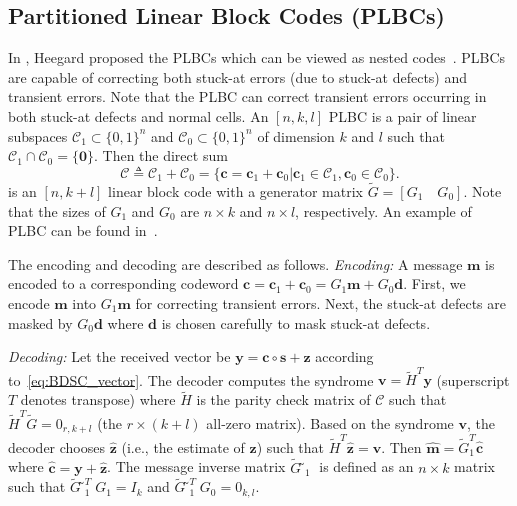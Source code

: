 \documentclass[10pt,twocolumn,twoside,submit]{JCNtran}
\begin{document}
\subsection{Partitioned Linear Block Codes (PLBCs)} \label{subsec:PLBC}

	In \cite{Heegard1983plbc}, Heegard proposed the PLBCs which can be viewed as nested codes~\cite{Zamir2002nested}. PLBCs are capable of correcting both stuck-at errors (due to stuck-at defects) and transient errors. Note that the PLBC can correct transient errors occurring in both stuck-at defects and normal cells. An $[n,k,l]$ PLBC is a pair of linear subspaces ${\mathcal{C}}_1 \subset \{0, 1\}^n$ and ${\mathcal{C}}_0 \subset \{0, 1\}^n$ of dimension $k$ and $l$ such that ${\mathcal{C}}_1 \cap {\mathcal{C}}_0 =\{ \mathbf{0}\}$. Then the direct sum
	\begin{equation}\label{eq:direct_sum}
	{\mathcal{C}} \triangleq {\mathcal{C}}_1 + {\mathcal{C}}_0 = \{ {\mathbf{c}} = {\mathbf{c}}_1 + {\mathbf{c}}_0 | {\mathbf{c}}_1 \in {\mathcal{C}}_1 , {\mathbf{c}}_0 \in {\mathcal{C}}_0 \}. 
	\end{equation}
	is an $[n, k+l]$ linear block code with a generator matrix $\widetilde{G} = \left[ G_1 \quad G_0 \right]$. Note that the sizes of $G_1$ and $G_0$ are $n \times k$ and $n \times l$, respectively. An example of PLBC can be found in~\cite{Heegard1983plbc}.  
	
	The encoding and decoding are described as follows.		
	\emph{Encoding:} A message $\mathbf{m}$ is encoded to a corresponding codeword $\mathbf{c} = \mathbf{c}_1 + \mathbf{c}_0 = G_1\mathbf{m} + G_0\mathbf{d}$. First, we encode $\mathbf{m}$ into $G_1 \mathbf{m}$ for correcting transient errors. Next, the stuck-at defects are masked by $G_0 \mathbf{d}$ where $\mathbf{d}$ is chosen carefully to mask stuck-at defects. %
	
	\emph{Decoding:} Let the received vector be $\mathbf{y} = \mathbf{c} \circ \mathbf{s} + \mathbf{z}$ according to~\eqref{eq:BDSC_vector}. The decoder computes the syndrome ${\mathbf{v}} = \widetilde{H}^T {\mathbf{y}}$ (superscript $T$ denotes transpose) where $\widetilde{H}$ is the parity check matrix of $\mathcal{C}$ such that $\widetilde{H}^T \widetilde{G} = 0_{r, k+l}$ (the $r \times (k+l)$ all-zero matrix). Based on the syndrome $\mathbf{v}$, the decoder chooses $\widehat{\mathbf{z}}$ (i.e., the estimate of $\mathbf{z}$) such that $\widetilde{H}^T \widehat{\mathbf{z}} = \mathbf{v}$. Then $\widehat{\mathbf{m}} =  \widetilde{G}_1^T \widehat{\mathbf{c}}$ where $\widehat{\mathbf{c}}= \mathbf{y} + \widehat{\mathbf{z}}$. The message inverse matrix $\widetilde{G}̃_1$ is defined as an $n \times k$ matrix such that $\widetilde{G}̃_1^{T} G_1 =I_k$ and $\widetilde{G}̃_1^{T} G_0 =0_{k, l}$. 	
	
\end{document}
